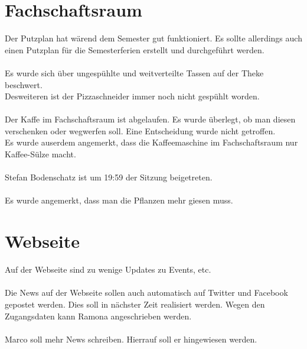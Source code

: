 \documentclass[a4paper, 11pt]{article} %
\begin{document}
\section{Fachschaftsraum}
Der Putzplan hat wärend dem Semester gut funktioniert. Es sollte allerdings auch einen Putzplan für die Semesterferien erstellt und durchgeführt werden. \\
\\
Es wurde sich über ungespühlte und weitverteilte Tassen auf der Theke beschwert. \\
Desweiteren ist der Pizzaschneider immer noch nicht gespühlt worden. \\
\\
Der Kaffe im Fachschaftsraum ist abgelaufen. Es wurde überlegt, ob man diesen verschenken oder wegwerfen soll. Eine Entscheidung wurde nicht getroffen. \\
Es wurde auserdem angemerkt, dass die Kaffeemaschine im Fachschaftsraum nur Kaffee-Sülze macht. \\
\\
Stefan Bodenschatz ist um 19:59 der Sitzung beigetreten. \\
\\
Es wurde angemerkt, dass man die Pflanzen mehr giesen muss. \\

\section{Webseite}
Auf der Webseite sind zu wenige Updates zu Events, etc. \\
\\
Die News auf der Webseite sollen auch automatisch auf Twitter und Facebook gepostet werden. Dies soll in nächster Zeit realisiert werden. Wegen den Zugangsdaten kann Ramona angeschrieben werden. \\
\\
Marco soll mehr News schreiben. Hierrauf soll er hingewiesen werden. \\
\end{document}

